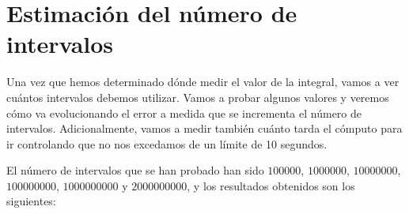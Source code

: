 \documentclass[11pt,a4paper]{article}
\begin{document}
\section{Estimación del número de intervalos}

Una vez que hemos determinado dónde medir el valor de la integral, vamos a ver cuántos intervalos
debemos utilizar. Vamos a probar algunos valores y veremos cómo va evolucionando el error
a medida que se incrementa el número de intervalos. Adicionalmente, vamos a medir también cuánto
tarda el cómputo para ir controlando que no nos excedamos de un límite de 10 segundos.

El número de intervalos que se han probado han sido $100000$, $1000000$, $10000000$, $100000000$,
$1000000000$ y $2000000000$, y los resultados obtenidos son los siguientes:
\end{document}
